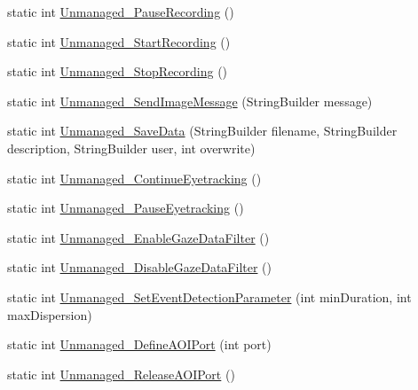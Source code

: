 \begin{DoxyCompactItemize}
static int \hyperlink{class_web_analyzer_1_1_eye_tracking_1_1_eye_tracking_controller_aa65720720634c95fa5a2ef9183030fdd}{Unmanaged\+\_\+\+Pause\+Recording} ()
\item 
static int \hyperlink{class_web_analyzer_1_1_eye_tracking_1_1_eye_tracking_controller_a077770ecec95783d919393a0d582c8c0}{Unmanaged\+\_\+\+Start\+Recording} ()
\item 
static int \hyperlink{class_web_analyzer_1_1_eye_tracking_1_1_eye_tracking_controller_ae7497b15d074e24e8c2bf5e51dc617fb}{Unmanaged\+\_\+\+Stop\+Recording} ()
\item 
static int \hyperlink{class_web_analyzer_1_1_eye_tracking_1_1_eye_tracking_controller_a7245c2ba1f531175ac8423cafb917ebc}{Unmanaged\+\_\+\+Send\+Image\+Message} (String\+Builder message)
\item 
static int \hyperlink{class_web_analyzer_1_1_eye_tracking_1_1_eye_tracking_controller_ae64882eea2bbf807174c26f3f7f9b579}{Unmanaged\+\_\+\+Save\+Data} (String\+Builder filename, String\+Builder description, String\+Builder user, int overwrite)
\item 
static int \hyperlink{class_web_analyzer_1_1_eye_tracking_1_1_eye_tracking_controller_a0251ea3316cd40104672ca454c32fea0}{Unmanaged\+\_\+\+Continue\+Eyetracking} ()
\item 
static int \hyperlink{class_web_analyzer_1_1_eye_tracking_1_1_eye_tracking_controller_a6d503085a7e573a3cb8739f565e96662}{Unmanaged\+\_\+\+Pause\+Eyetracking} ()
\item 
static int \hyperlink{class_web_analyzer_1_1_eye_tracking_1_1_eye_tracking_controller_a03c27615c5818dcd7f81461498c43409}{Unmanaged\+\_\+\+Enable\+Gaze\+Data\+Filter} ()
\item 
static int \hyperlink{class_web_analyzer_1_1_eye_tracking_1_1_eye_tracking_controller_af56e0b8198a8cd79d950dc5fd9b7769c}{Unmanaged\+\_\+\+Disable\+Gaze\+Data\+Filter} ()
\item 
static int \hyperlink{class_web_analyzer_1_1_eye_tracking_1_1_eye_tracking_controller_aa40d32493a0e03bb7d2c6fb4efadbbb3}{Unmanaged\+\_\+\+Set\+Event\+Detection\+Parameter} (int min\+Duration, int max\+Dispersion)
\item 
static int \hyperlink{class_web_analyzer_1_1_eye_tracking_1_1_eye_tracking_controller_aa29d345faefa2b946ec2b86cec7908e9}{Unmanaged\+\_\+\+Define\+A\+O\+I\+Port} (int port)
\item 
static int \hyperlink{class_web_analyzer_1_1_eye_tracking_1_1_eye_tracking_controller_a522ef92feef19efa94b66fdb9050e13e}{Unmanaged\+\_\+\+Release\+A\+O\+I\+Port} ()

\end{DoxyCompactItemize}
